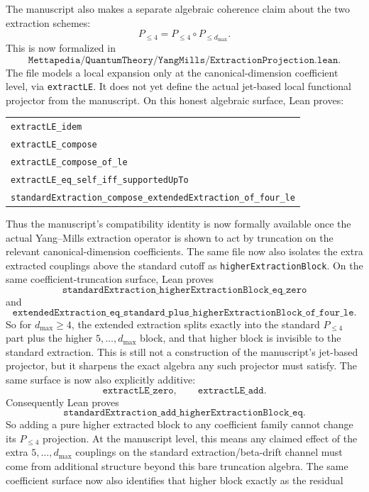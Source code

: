 \documentclass[11pt]{article}
\newcommand{\lean}[1]{\texttt{#1}}
\newcommand{\leansmall}[1]{{\small\texttt{#1}}}
\begin{document}
The manuscript also makes a separate algebraic coherence claim about the two
extraction schemes:
\[
  P_{\le 4}=P_{\le 4}\circ P_{\le d_{\max}}.
\]
This is now formalized in
\[
  \lean{Mettapedia/QuantumTheory/YangMills/ExtractionProjection.lean}.
\]
The file models a local expansion only at the canonical-dimension coefficient
level, via \lean{extractLE}.  It does not yet define the actual jet-based local
functional projector from the manuscript.  On this honest algebraic surface,
Lean proves:
\begin{center}
\begin{tabular}{l}
\leansmall{extractLE\_idem}\\
\leansmall{extractLE\_compose}\\
\leansmall{extractLE\_compose\_of\_le}\\
\leansmall{extractLE\_eq\_self\_iff\_supportedUpTo}\\
\leansmall{standardExtraction\_compose\_extendedExtraction\_of\_four\_le}
\end{tabular}
\end{center}
Thus the manuscript's compatibility identity is now formally available once the
actual Yang--Mills extraction operator is shown to act by truncation on the
relevant canonical-dimension coefficients.
The same file now also isolates the extra extracted couplings above the standard
cutoff as \lean{higherExtractionBlock}.  On the same coefficient-truncation
surface, Lean proves
\[
  \lean{standardExtraction\_higherExtractionBlock\_eq\_zero}
\]
and
\[
  \lean{extendedExtraction\_eq\_standard\_plus\_higherExtractionBlock\_of\_four\_le}.
\]
So for \(d_{\max}\ge 4\), the extended extraction splits exactly into the
standard \(P_{\le 4}\) part plus the higher \(5,\ldots,d_{\max}\) block, and
that higher block is invisible to the standard extraction.  This is still not a
construction of the manuscript's jet-based projector, but it sharpens the exact
algebra any such projector must satisfy.
The same surface is now also explicitly additive:
\[
  \lean{extractLE\_zero},
  \qquad
  \lean{extractLE\_add}.
\]
Consequently Lean proves
\[
  \lean{standardExtraction\_add\_higherExtractionBlock\_eq}.
\]
So adding a pure higher extracted block to any coefficient family cannot change
its \(P_{\le 4}\) projection.  At the manuscript level, this means any claimed
effect of the extra \(5,\ldots,d_{\max}\) couplings on the standard
extraction/beta-drift channel must come from additional structure beyond this
bare truncation algebra.  The same coefficient surface now also identifies that
higher block exactly as the residual
\end{document}
